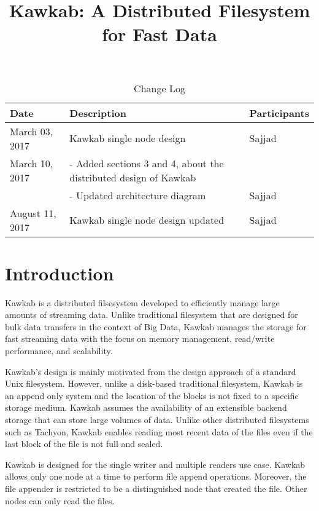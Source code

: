 \documentclass[]{article}
\begin{document}
\title{Kawkab: A Distributed Filesystem for Fast Data}
\date{}
\maketitle

\bgroup
\def\arraystretch{1.5}
\begin{table}[!htb]
\centering
\caption{Change Log}
\label{table:change-log}
\begin{tabular}{|l|l|l|}
\hline
\rowcolor[HTML]{EFEFEF} 
Date             & Description  & Participants  \\ \hline
 March 03, 2017  & Kawkab single node design           & Sajjad  \\ \hline
 March 10, 2017  & - Added sections 3 and 4, about the distributed design of Kawkab& \\ 
                 & - Updated architecture diagram & Sajjad  \\ \hline
 August 11, 2017  & Kawkab single node design updated  & Sajjad  \\ \hline
\end{tabular}
\end{table}
\egroup


\section{Introduction} 

Kawkab is a distributed filsesystem developed to efficiently manage large
amounts of streaming data. Unlike traditional filesystem that are designed for
bulk data transfers in the context of Big Data, Kawkab manages the storage for
fast streaming data with the focus on memory management, read/write
performance, and scalability.


Kawkab's design is mainly motivated from the design approach of a standard Unix filesystem.
However, unlike a disk-based traditional filesystem, Kawkab is an append only
system  and the location of the blocks is not fixed to a specific storage
medium. Kawkab assumes the availability of an extensible backend storage that
can store large volumes of data. Unlike other distributed filesystems such
as Tachyon, Kawkab enables reading most recent data of the files even if the
last block of the file is not full and sealed. 

Kawkab is designed for the single writer and multiple readers use case. Kawkab
allows only one node at a time to perform file append operations. Moreover,
the file appender is restricted to be a distinguished node that created
the file. Other nodes can only read the files.
\end{document}
